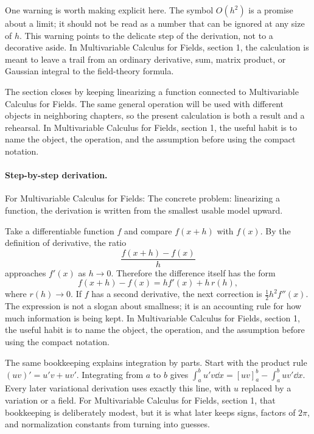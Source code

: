 One warning is worth making explicit here.  The symbol \(O(h^2)\) is a promise about a limit; it should not be read as a number that can be ignored at any size of \(h\).  This warning points to the delicate step of the derivation, not to a decorative aside.  In Multivariable Calculus for Fields, section 1, the calculation is meant to leave a trail from an ordinary derivative, sum, matrix product, or Gaussian integral to the field-theory formula.

The section closes by keeping linearizing a function connected to Multivariable Calculus for Fields.  The same general operation will be used with different objects in neighboring chapters, so the present calculation is both a result and a rehearsal.  In Multivariable Calculus for Fields, section 1, the useful habit is to name the object, the operation, and the assumption before using the compact notation.



\paragraph{Step-by-step derivation.}

For Multivariable Calculus for Fields: The concrete problem: linearizing a function, the derivation is written from the smallest usable model upward.

Take a differentiable function \(f\) and compare \(f(x+h)\) with \(f(x)\).  By the definition of derivative, the ratio
\[
  \frac{f(x+h)-f(x)}{h}
\]
approaches \(f'(x)\) as \(h\to0\).  Therefore the difference itself has the form
\[
  f(x+h)-f(x)=hf'(x)+h\,r(h),
\]
where \(r(h)\to0\).  If \(f\) has a second derivative, the next correction is \(\frac12h^2f''(x)\).  The expression is not a slogan about smallness; it is an accounting rule for how much information is being kept.  In Multivariable Calculus for Fields, section 1, the useful habit is to name the object, the operation, and the assumption before using the compact notation.

The same bookkeeping explains integration by parts.  Start with the product rule \((uv)'=u'v+uv'\).  Integrating from \(a\) to \(b\) gives \(\int_a^b u'v\dd x=[uv]_a^b-\int_a^buv'\dd x\).  Every later variational derivation uses exactly this line, with \(u\) replaced by a variation or a field.  For Multivariable Calculus for Fields, section 1, that bookkeeping is deliberately modest, but it is what later keeps signs, factors of \(2\pi\), and normalization constants from turning into guesses.

